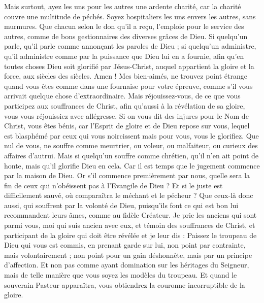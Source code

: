 \begin{multicols}{2}
Mais surtout, ayez les uns pour les autres une ardente charité, car la charité couvre une multitude de péchés.
Soyez hospitaliers les uns envers les autres, sans murmures. 
Que chacun selon le don qu'il a reçu, l'emploie pour le service des autres, comme de bons gestionnaires des diverses grâces de Dieu. 
Si quelqu'un parle, qu'il parle comme annonçant les paroles de Dieu ; si quelqu'un administre, qu'il administre comme par la puissance que Dieu lui en a fournie, afin qu'en toutes choses Dieu soit glorifié par Jésus-Christ, auquel appartient la gloire et la force, aux siècles des siècles. Amen ! 
Mes bien-aimés, ne trouvez point étrange quand vous êtes comme dans une fournaise pour votre épreuve, comme s'il vous arrivait quelque chose d'extraordinaire. 
Mais réjouissez-vous, de ce que vous participez aux souffrances de Christ, afin qu'aussi à la révélation de sa gloire, vous vous réjouissiez avec allégresse.
Si on vous dit des injures pour le Nom de Christ, vous êtes bénis, car l'Esprit de gloire et de Dieu repose sur vous, lequel est blasphémé par ceux qui vous noircissent mais pour vous, vous le glorifiez.
Que nul de vous, ne souffre comme meurtrier, ou voleur, ou malfaiteur, ou curieux des affaires d'autrui. 
Mais si quelqu'un souffre comme chrétien, qu'il n'en ait point de honte, mais qu'il glorifie Dieu en cela.
Car il est temps que le jugement commence par la maison de Dieu. Or s'il commence premièrement par nous, quelle sera la fin de ceux qui n'obéissent pas à l'Evangile de Dieu ?
Et si le juste est difficilement sauvé, où comparaîtra le méchant et le pécheur ? 
Que ceux-là donc aussi, qui souffrent par la volonté de Dieu, puisqu'ils font ce qui est bon lui recommandent leurs âmes, comme au fidèle Créateur. 
\VerseOne{}Je prie les anciens qui sont parmi vous, moi qui suis ancien avec eux, et témoin des souffrances de Christ, et participant de la gloire qui doit être révélée et je leur dis : 
Paissez le troupeau de Dieu qui vous est commis, en prenant garde sur lui, non point par contrainte, mais volontairement ; non point pour un gain déshonnête, mais par un principe d'affection. 
Et non pas comme ayant domination sur les héritages du Seigneur, mais de telle manière que vous soyez les modèles du troupeau. 
Et quand le souverain Pasteur apparaîtra, vous obtiendrez la couronne incorruptible de la gloire.

\end{multicols}
